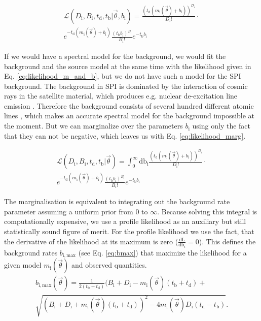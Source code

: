 \documentclass[twocolumn,traditabstract]{aa}
\begin{document}
\begin{multline}
	\mathcal{L}(D_{\mathrm{i}}, B_{\mathrm{i}},t_{\mathrm{d}},t_{\mathrm{b}}|\vec{\theta}, b_{\mathrm{i}}) = \frac{(t_{\mathrm{d}}(m_{\mathrm{i}}(\vec{\theta})+ b_{\mathrm{i}}))^{D_{\mathrm{i}}}}{D_{\mathrm{i}}!}\cdot \\
  e^{-t_{\mathrm{d}}(m_{\mathrm{i}}(\vec{\theta})+b_{\mathrm{i}})}\frac{(t_{\mathrm{b}} b_{\mathrm{i}})^{B_{\mathrm{i}}}}{B_{\mathrm{i}}!} e^{-t_{\mathrm{b}} b_{\mathrm{i}}}
  \label{eq:likelihood_m_and_b}
\end{multline}

If we would have a spectral model for the background, we would fit the background and the source model at the same time with the likelihood given in Eq. \ref{eq:likelihood_m_and_b}, but we do not have such a model for the SPI background. The background in SPI is dominated by the interaction of cosmic rays in the satellite material, which produces e.g. nuclear de-excitation line emission \citep{spi_bkg}. Therefore the background consists of several hundred different atomic lines \citep{spi_bkg}, which makes an accurate spectral model for the background impossible at the moment. But we can marginalize over the parameters $b_{\mathrm{i}}$ using only the fact that they can not be negative, which leaves us with Eq. \ref{eq:likelihood_marg}.

\begin{multline}
	\mathcal{L}(D_{\mathrm{i}}, B_{\mathrm{i}},t_{\mathrm{d}},t_{\mathrm{b}}|\vec{\theta}) = \int_{0}^{\infty}\textrm{db}_{\mathrm{i}}\frac{(t_{\mathrm{d}}(m_{\mathrm{i}}(\vec{\theta})+ b_{\mathrm{i}}))^{D_{\mathrm{i}}}}{D_{\mathrm{i}}!}\cdot\\
  e^{-t_{\mathrm{d}}(m_{\mathrm{i}}(\vec{\theta})+b_{\mathrm{i}})} \frac{(t_{\mathrm{b}} b_{\mathrm{i}})^{B_{\mathrm{i}}}}{B_{\mathrm{i}}!} e^{-t_{\mathrm{b}}b_{\mathrm{i}}}
  \label{eq:likelihood_marg}
\end{multline}

The marginalisation is equivalent to integrating out the background rate parameter assuming a uniform prior from 0 to $\infty$. Because solving this integral is computationally expensive, we use a profile likelihood as an auxiliary but still statistically sound figure of merit. For the profile likelihood we use the fact, that the derivative of the likelihood at its maximum is zero ($\frac{\textrm{dL}}{\textrm{db}_i}=0$). This defines the background rates $b_\mathrm{{i, max}}$ (see Eq. \ref{eq:bmax}) that maximize the likelihood for a given model $m_{\mathrm{i}}(\vec{\theta})$ and observed quantities.
\begin{multline}
	b_{\mathrm{i,max}}(\vec{\theta})=\frac{1}{2(t_{\mathrm{b}}+t_{\mathrm{d}})}(B_{\mathrm{i}}+D_{\mathrm{i}}-m_{\mathrm{i}}(\vec{\theta})(t_{\mathrm{b}}+t_{\mathrm{d}})+\\
  \sqrt{(B_{\mathrm{i}}+D_{\mathrm{i}}+m_{\mathrm{i}}(\vec{\theta})(t_{\mathrm{b}}+t_{\mathrm{d}}))^{2}-4m_{\mathrm{i}}(\vec{\theta})D_{\mathrm{i}}(t_{\mathrm{d}}-t_{\mathrm{b}})}.
  \label{eq:bmax}
\end{multline}
\end{document}
